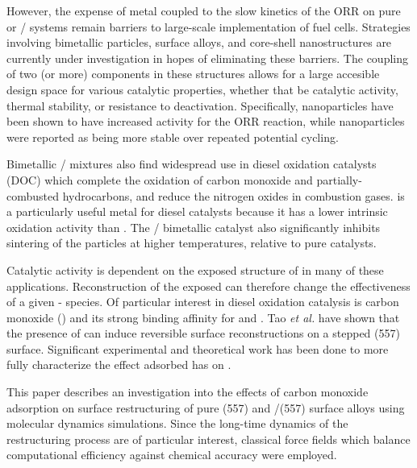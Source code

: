However, the expense of  metal coupled to the slow kinetics of
the ORR on pure  or / systems remain barriers to
large-scale implementation of fuel cells. Strategies involving
bimetallic particles, surface alloys, and core-shell nanostructures
are currently under investigation in hopes of eliminating these
barriers.\citep{Gao:2009oj,Gao:2009wo,Kim:2013jt} The coupling of two
(or more) components in these structures allows for a large accesible
design space for various catalytic properties, whether that be
catalytic activity,\citep{Kim:2013jt,Sneed:2014fj,Gu:2015cr} thermal
stability,\citep{Cao:2010gf,Yang:0pd,Huang:2012ul} or resistance to
deactivation.\citep{Yu:2013fr,Zhang:2015yq} Specifically,
 nanoparticles have been shown to have increased
activity for the ORR reaction,\citep{Lim:2009fk,Liu:2012bs,Shao:2013rm}
while  nanoparticles were reported as being more
stable over repeated potential cycling.\citep{Zhang:2007lq}

Bimetallic / mixtures also find widespread use in diesel
oxidation catalysts (DOC) which complete the oxidation of carbon
monoxide and partially-combusted hydrocarbons, and reduce the nitrogen
oxides in combustion gases.\citep{Morlang:2005uq,Russell:2011fk}
 is a particularly useful metal for diesel catalysts because it
has a lower intrinsic  oxidation activity than
.\citep{Russell:2011fk} The / bimetallic catalyst
also significantly inhibits sintering of the particles at higher
temperatures, relative to pure  catalysts.\citep{Morlang:2005uq}

Catalytic activity is dependent on the exposed structure of  in
many of these applications. Reconstruction of the exposed  can
therefore change the effectiveness of a given - species.
Of particular interest in diesel oxidation catalysis is carbon
monoxide () and its strong binding affinity for  and
. Tao \textit{et al.} have shown that the presence of 
can induce reversible surface reconstructions on a stepped
(557) surface.\citep{Tao:2010} Significant experimental and
theoretical work has been done to more fully characterize the effect
adsorbed  has on
.\citep{Batteas:1996rc,Thostrup:2001dn,McCarthy:2012qd,Michalka:2013,Carenco:2014}

This paper describes an investigation into the effects of carbon
monoxide adsorption on surface restructuring of pure (557) and
/(557) surface alloys using molecular dynamics
simulations. Since the long-time dynamics of the restructuring process
are of particular interest, classical force fields which balance
computational efficiency against chemical accuracy were employed.

